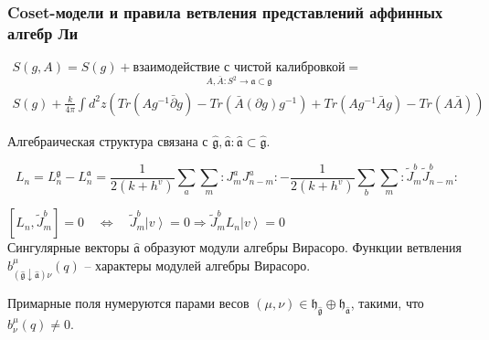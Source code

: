 \documentclass[pdftex]{beamer}
\newcommand{\gf}{\mathfrak{g}}
\newcommand{\gfh}{\hat{\mathfrak{g}}}
\newcommand{\af}{\mathfrak{a}}
\newcommand{\afh}{\hat{\mathfrak{a}}}
\newcommand{\hf}{\mathfrak{h}}
\theoremstyle{definition} \newtheorem{Def}{Определение}
\begin{document}
\begin{frame}
  \frametitle{Coset-модели и правила ветвления представлений аффинных алгебр Ли}
  \vspace{-20pt}
  \begin{multline*}
    S(g,A)=S(g)+\boxed{\underset{ {\scriptstyle    A, \bar{A}:S^2\to \af\subset \gf}}{\mbox{взаимодействие с чистой калибровкой}}}=\\
    S(g)+\frac{k}{4\pi}\int d^{2}z \left(Tr(A g^{-1}\bar \partial g)-Tr(\bar A (\partial g ) g^{-1})+Tr(A g^{-1}\bar A g)-Tr(A \bar A)\right)
  \end{multline*}




  Алгебраическая структура связана с  $\gfh, \afh: \afh\subset\gfh$. 

  \begin{equation*}
    L_{n}=L_{n}^{\gf}-L_{n}^{\af}=\frac{1}{2(k+h^v)}\sum\limits_a\sum\limits_m:J^a_m J^a_{n-m}: - \frac{1}{2(k+h^v)}\sum\limits_b\sum\limits_m:\tilde{J}^b_m \tilde{J}^b_{n-m}:
  \end{equation*}

  $\left[ L_{n}, \tilde{J}^{b}_{m}\right]=0 \quad\Longleftrightarrow\quad \tilde{J}^{b}_{m}\left| v \right>=0\Rightarrow \tilde{J}^{b}_{m}L_{n}\left| v \right>=0 $\\
  Сингулярные векторы $\afh$ образуют модули алгебры Вирасоро. Функции ветвления $b^{\mu}_{(\gfh\downarrow\afh) \nu}(q)$  -- характеры модулей алгебры Вирасоро.

  Примарные поля нумеруются парами весов $(\mu,\nu)\in \hf_{\gfh}\oplus \hf_{\afh}$, такими, что  $b^{\mu}_{\nu}(q)\neq 0$. 

\end{frame}
\end{document}
